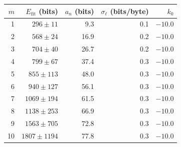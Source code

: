 \begin{tabular}{@{}r rrrr@{}}
\toprule
$m$ & $E_{\mathrm{fit}}$ (bits) & $a_n$ (bits) & $\sigma_\ell$ (bits/byte) & $k_0$ \\
\midrule
1  & $296 \pm 11$ & 9.3 & 0.1 & $-10.0$ \\
2  & $568 \pm 24$ & 16.9 & 0.2 & $-10.0$ \\
3  & $704 \pm 40$ & 26.7 & 0.2 & $-10.0$ \\
4  & $799 \pm 67$ & 37.4 & 0.3 & $-10.0$ \\
5  & $855 \pm 113$ & 48.0 & 0.3 & $-10.0$ \\
6  & $940 \pm 127$ & 56.1 & 0.3 & $-10.0$ \\
7  & $1069 \pm 194$ & 61.5 & 0.3 & $-10.0$ \\
8  & $1138 \pm 253$ & 66.9 & 0.3 & $-10.0$ \\
9  & $1563 \pm 705$ & 72.8 & 0.3 & $-10.0$ \\
10  & $1807 \pm 1194$ & 77.8 & 0.3 & $-10.0$ \\
\bottomrule
\end{tabular}
